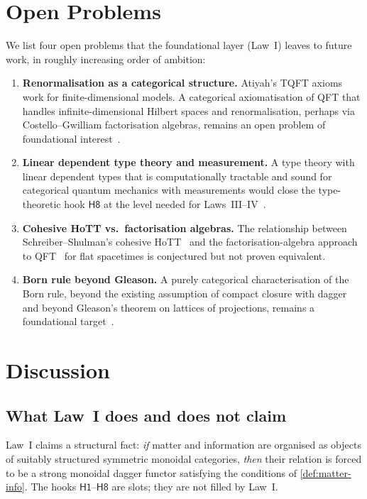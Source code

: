 \documentclass[12pt]{article}
\theoremstyle{definition}
\theoremstyle{remark}
\begin{document}
\section{Open Problems}
\label{sec:open-problems}

We list four open problems that the foundational layer (Law~I) leaves to future work, in roughly increasing order of ambition:

\begin{enumerate}
\item \textbf{Renormalisation as a categorical structure.} Atiyah's TQFT axioms work for finite-dimensional models. A categorical axiomatisation of QFT that handles infinite-dimensional Hilbert spaces and renormalisation, perhaps via Costello--Gwilliam factorisation algebras, remains an open problem of foundational interest~\cite{costello2017}.
\item \textbf{Linear dependent type theory and measurement.} A type theory with linear dependent types that is computationally tractable and sound for categorical quantum mechanics with measurements would close the type-theoretic hook $\mathsf{H8}$ at the level needed for Laws~III--IV~\cite{fukishidaselinger2020}.
\item \textbf{Cohesive HoTT vs.\ factorisation algebras.} The relationship between Schreiber--Shulman's cohesive HoTT~\cite{schreibershulman2014} and the factorisation-algebra approach to QFT~\cite{costello2017} for flat spacetimes is conjectured but not proven equivalent.
\item \textbf{Born rule beyond Gleason.} A purely categorical characterisation of the Born rule, beyond the existing assumption of compact closure with dagger and beyond Gleason's theorem on lattices of projections, remains a foundational target~\cite{abramskycoecke2004}.
\end{enumerate}

\section{Discussion}
\label{sec:discussion}

\subsection{What Law~I does and does not claim}

Law~I claims a structural fact: \emph{if} matter and information are organised as objects of suitably structured symmetric monoidal categories, \emph{then} their relation is forced to be a strong monoidal dagger functor satisfying the conditions of \cref{def:matter-info}. The hooks $\mathsf{H1}$--$\mathsf{H8}$ are slots; they are not filled by Law~I.
\end{document}
